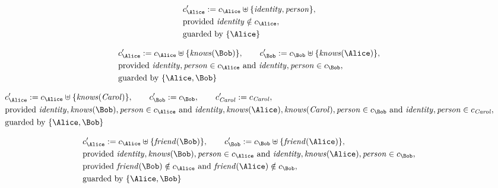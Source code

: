 \begin{align*}
&
c'_
{
\Alice
}
 := 
c_
{
\Alice
}
 \uplus 
\{
\mathit{
identity
}
,
\mathit{
person
}
\}
,\\
&
\text{provided } 
\mathit{
identity
}
 \notin c_
{
\Alice
}
,\\
&
\text{guarded by } \{
\Alice
\}
\end{align*}

\begin{align*}
&
c'_
{
\Alice
}
 := 
c_
{
\Alice
}
 \uplus 
\{
\mathit{
knows
}
(
\Bob
)
\}
, \qquad 
c'_
{
\Bob
}
 := 
c_
{
\Bob
}
 \uplus 
\{
\mathit{
knows
}
(
\Alice
)
\}
,\\
&
\text{provided } 
\mathit{
identity
}
,
\mathit{
person
}
 \in c_
{
\Alice
}
 \text{ and } 
\mathit{
identity
}
,
\mathit{
person
}
 \in c_
{
\Bob
}
,\\
&
\text{guarded by } \{
\Alice
,
\Bob
\}
\end{align*}

\begin{align*}
&
c'_
{
\Alice
}
 := 
c_
{
\Alice
}
 \uplus 
\{
\mathit{
knows
}
(
\mathit{Carol}
)
\}
, \qquad 
c'_
{
\Bob
}
 := 
c_
{
\Bob
}
, \qquad 
c'_
{
\mathit{Carol}
}
 := 
c_
{
\mathit{Carol}
}
,\\
&
\text{provided } 
\mathit{
identity
}
,
\mathit{
knows
}
(
\Bob
)
,
\mathit{
person
}
 \in c_
{
\Alice
}
 \text{ and } 
\mathit{
identity
}
,
\mathit{
knows
}
(
\Alice
)
,
\mathit{
knows
}
(
\mathit{Carol}
)
,
\mathit{
person
}
 \in c_
{
\Bob
}
 \text{ and } 
\mathit{
identity
}
,
\mathit{
person
}
 \in c_
{
\mathit{Carol}
}
,\\
&
\text{guarded by } \{
\Alice
,
\Bob
\}
\end{align*}

\begin{align*}
&
c'_
{
\Alice
}
 := 
c_
{
\Alice
}
 \uplus 
\{
\mathit{
friend
}
(
\Bob
)
\}
, \qquad 
c'_
{
\Bob
}
 := 
c_
{
\Bob
}
 \uplus 
\{
\mathit{
friend
}
(
\Alice
)
\}
,\\
&
\text{provided } 
\mathit{
identity
}
,
\mathit{
knows
}
(
\Bob
)
,
\mathit{
person
}
 \in c_
{
\Alice
}
 \text{ and } 
\mathit{
identity
}
,
\mathit{
knows
}
(
\Alice
)
,
\mathit{
person
}
 \in c_
{
\Bob
}
,\\
&
\text{provided } 
\mathit{
friend
}
(
\Bob
)
 \notin c_
{
\Alice
}
 \text{ and } 
\mathit{
friend
}
(
\Alice
)
 \notin c_
{
\Bob
}
,\\
&
\text{guarded by } \{
\Alice
,
\Bob
\}
\end{align*}

